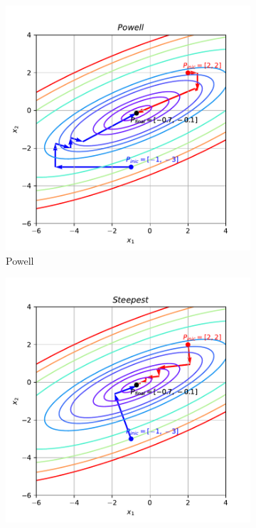 \documentclass[10pt, a4paper]{article}
\begin{document}
\begin{figure}[htpb]
\begin{subfigure}[b]{0.32\textwidth}
    \includegraphics[width=\textwidth]{images/q1a_Powell.pdf}
    \caption{Powell}
    \label{fig:q1a_powell}
  \end{subfigure}
  \hfill
  \begin{subfigure}[b]{0.32\textwidth}
    \centering
    \includegraphics[width=\textwidth]{images/q1a_Steepest.pdf}

\end{subfigure}
\end{figure}
\end{document}
